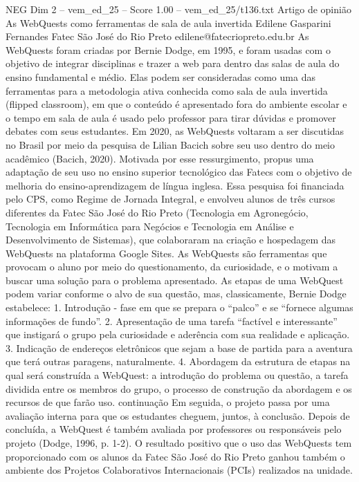 \begin{textsample}{NEG Dim 2 – vem\_ed\_25 – Score 1.00 – vem\_ed\_25/t136.txt}  \label{ex:f2_neg_017}
Artigo de opinião As WebQuests como ferramentas de sala de aula invertida Edilene Gasparini Fernandes Fatec São José do Rio Preto edilene@fatecriopreto.edu.br As WebQuests foram criadas por Bernie Dodge, em 1995, e foram usadas com o objetivo de integrar disciplinas e trazer a web para dentro das salas de aula do ensino fundamental e médio.
Elas podem ser consideradas como uma das ferramentas para a metodologia ativa conhecida como sala de aula invertida (flipped classroom), em que o conteúdo é apresentado fora do ambiente escolar e o tempo em sala de aula é usado pelo professor para tirar dúvidas e promover debates com seus estudantes.
Em 2020, as WebQuests voltaram a ser discutidas no Brasil por meio da pesquisa de Lilian Bacich sobre seu uso dentro do meio acadêmico (Bacich, 2020).
Motivada por esse ressurgimento, propus uma adaptação de seu uso no ensino superior tecnológico das Fatecs com o objetivo de melhoria do ensino-aprendizagem de língua inglesa.
Essa pesquisa foi financiada pelo CPS, como Regime de Jornada Integral, e envolveu alunos de três cursos diferentes da Fatec São José do Rio Preto (Tecnologia em Agronegócio, Tecnologia em Informática para Negócios e Tecnologia em Análise e Desenvolvimento de Sistemas), que colaboraram na criação e hospedagem das WebQuests na plataforma Google Sites.
As WebQuests são ferramentas que provocam o aluno por meio do questionamento, da curiosidade, e o motivam a buscar uma solução para o problema apresentado.
As etapas de uma WebQuest podem variar conforme o alvo de sua questão, mas, classicamente, Bernie Dodge estabelece: 1.
Introdução - fase em que se prepara o “palco” e se “fornece algumas informações de fundo”. 2.
Apresentação de uma tarefa “factível e interessante” que instigará o grupo pela curiosidade e aderência com sua realidade e aplicação. 3.
Indicação de endereços eletrônicos que sejam a base de partida para a aventura que terá outras paragens, naturalmente. 4.
Abordagem da estrutura de etapas na qual será construída a WebQuest: a introdução do problema ou questão, a tarefa dividida entre os membros do grupo, o processo de construção da abordagem e os recursos de que farão uso. continuação Em seguida, o projeto passa por uma avaliação interna para que os estudantes cheguem, juntos, à conclusão.
Depois de concluída, a WebQuest é também avaliada por professores ou responsáveis pelo projeto (Dodge, 1996, p. 1-2).
O resultado positivo que o uso das WebQuests tem proporcionado com os alunos da Fatec São José do Rio Preto ganhou também o ambiente dos Projetos Colaborativos Internacionais (PCIs) realizados na unidade.

\end{textsample}
